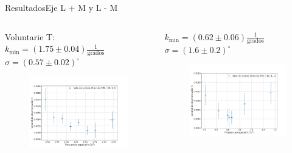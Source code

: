 \documentclass[
    11pt, %
    aspectratio=169, %
]{beamer}
\begin{document}
\begin{frame}{Resultados}{Eje L + M y L - M}
    \begin{columns}[c] %

    
		\begin{column}{0.50\textwidth} %
            \begin{center}
                Voluntarie T: \\ $k_{\text{min}} = (1.75 \pm 0.04)\frac{1}{\text{grados}}$ \\ $\sigma = (0.57 \pm 0.02)^\circ$
            \end{center}
                     \begin{figure}[h!]
                    \centering
                    \includegraphics[angle=0, width=5cm]{Images/resultados/l_mas_m_yo.png}
                \end{figure}
               
        
               
		\end{column}

    
  		\begin{column}{0.50\textwidth} %
            \begin{center}
                $k_\text{min} = (0.62 \pm 0.06)\frac{1}{\text{grados}}$ \\ $\sigma = (1.6 \pm 0.2)^\circ$
            \end{center}
                 \begin{figure}[h!]
                    \centering
                    \includegraphics[angle=0, width=5cm]{Images/resultados/l_menos_m_yo.png}
                \end{figure}
		\end{column}		
	\end{columns}

\end{frame}
\end{document}
